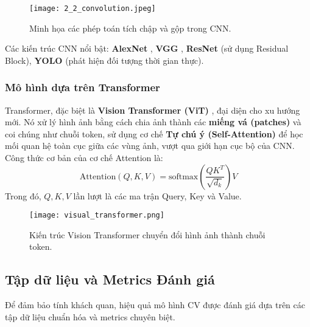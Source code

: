 \begin{figure}[h]
    \centering
    \texttt{[image: 2\_2\_convolution.jpeg]}
    \caption{Minh họa các phép toán tích chập và gộp trong CNN.}
    \label{fig:cnn_ops}
\end{figure}

Các kiến trúc CNN nổi bật: \textbf{AlexNet} \cite{krizhevsky2012imagenet}, \textbf{VGG} \cite{simonyan2014very}, \textbf{ResNet} \cite{he2016deep} (sử dụng Residual Block), \textbf{YOLO} \cite{redmon2016you} (phát hiện đối tượng thời gian thực).

\subsubsection{Mô hình dựa trên Transformer}
Transformer, đặc biệt là \textbf{Vision Transformer (ViT)} \cite{dosovitskiy2021image}, đại diện cho xu hướng mới. Nó xử lý hình ảnh bằng cách chia ảnh thành các \textbf{miếng vá (patches)} và coi chúng như chuỗi token, sử dụng cơ chế \textbf{Tự chú ý (Self-Attention)} để học mối quan hệ toàn cục giữa các vùng ảnh, vượt qua giới hạn cục bộ của CNN. Công thức cơ bản của cơ chế Attention là:
\begin{equation}
\text{Attention}(Q, K, V) = \text{softmax}\left(\frac{QK^T}{\sqrt{d_k}}\right)V
\end{equation}
Trong đó, $Q, K, V$ lần lượt là các ma trận Query, Key và Value.

\begin{figure}[h]
    \centering
    \texttt{[image: visual\_transformer.png]}
    \caption{Kiến trúc Vision Transformer chuyển đổi hình ảnh thành chuỗi token.}
    \label{fig:vit_arch}
\end{figure}

\subsection{Tập dữ liệu và Metrics Đánh giá}
Để đảm bảo tính khách quan, hiệu quả mô hình CV được đánh giá dựa trên các tập dữ liệu chuẩn hóa và metrics chuyên biệt.


